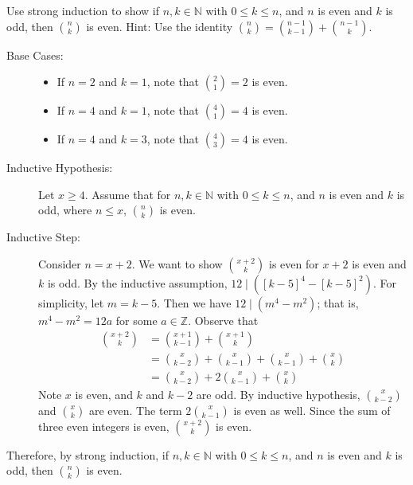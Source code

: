 \documentclass{article}
\newcommand{\Z}{\mathbb{Z}}
\theoremstyle{definition}
\begin{document}
\begin{question}
    Use strong induction to show if $n, k\in \mathbb{N}$ with $0\leq k\leq n$, and $n$ is even and $k$ is odd, then $\binom{n}{k}$ is even. Hint: Use the identity $\binom{n}{k} = \binom{n-1}{k-1} + \binom{n-1}{k}$.
\end{question}
\begin{solution}
	\begin{description}
	\item[Base Cases: ] 
	\begin{itemize}
	\item If $n=2$ and $k=1$, note that $\binom{2}{1} =2$ is even.
	\item If $n=4$ and $k=1$, note that $\binom{4}{1} =4$ is even.
	\item If $n=4$ and $k=3$, note that $\binom{4}{3} =4$ is even.
	\end{itemize}
	
	\item[Inductive Hypothesis: ] Let $x\geq 4$. Assume that for $n, k\in \mathbb{N}$ with $0\leq k\leq n$, and $n$ is even and $k$ is odd, where $n\leq x$, $\binom{n}{k}$ is even.
	
	\item[Inductive Step: ] Consider $n=x+2$.  We want to show $\binom{x+2}{k}$ is even for $x+2$ is even and $k$ is odd. 
	By the inductive assumption, $12 \mid ([k-5]^4-[k-5]^2)$. For simplicity, let $m=k-5$. Then we have $12\mid (m^4-m^2)$; that is, $m^4-m^2=12a$ for some $a\in \Z$. Observe that
	\begin{align*}
	\binom{x+2}{k}  & = \binom{x+1}{k-1} + \binom{x+1}{k}\\
				& = \binom{x}{k-2} + \binom{x}{k-1}+\binom{x}{k-1} + \binom{x}{k}\\
				& =  \binom{x}{k-2} + 2\binom{x}{k-1} + \binom{x}{k}
	\end{align*}
	Note $x$ is even, and $k$ and $k-2$ are odd. By inductive hypothesis, $\binom{x}{k-2}$ and $\binom{x}{k}$ are even. The term $2\binom{x}{k-1}$ is even as well. Since the sum of three even integers is even, $\binom{x+2}{k}$ is even.
	\end{description}
	Therefore, by strong induction, if $n, k\in \mathbb{N}$ with $0\leq k\leq n$, and $n$ is even and $k$ is odd, then $\binom{n}{k}$ is even.
\end{solution}
\end{document}
